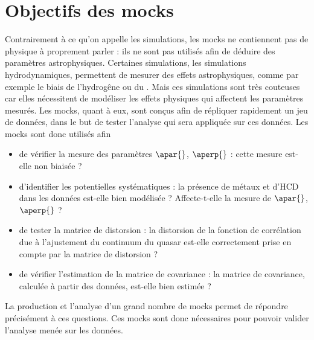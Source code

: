 \section{Objectifs des mocks}
Contrairement à ce qu'on appelle les simulations, les mocks ne contiennent pas de physique à proprement parler : ils ne sont pas utilisés afin de déduire des paramètres astrophysiques. Certaines simulations, les simulations hydrodynamiques, permettent de mesurer des effets astrophysiques, comme par exemple le biais de l'hydrogêne ou du \lya{}. Mais ces simulations sont très couteuses car elles nécessitent de modéliser les effets physiques qui affectent les paramètres mesurés.
Les mocks, quant à eux, sont conçus afin de répliquer rapidement un jeu de données, dans le but de tester l'analyse qui sera appliquée sur ces données.
Les mocks sont donc utilisés afin
\begin{itemize}[label=$\bullet$]
\item de vérifier la mesure des paramètres $\apar{}$, $\aperp{}$ : cette mesure est-elle non biaisée ?
\item d'identifier les potentielles systématiques : la présence de métaux et d'HCD dans les données est-elle bien modélisée ? Affecte-t-elle la mesure de $\apar{}$, $\aperp{}$ ?
\item de tester la matrice de distorsion : la distorsion de la fonction de corrélation due à l'ajustement du continuum du quasar est-elle correctement prise en compte par la matrice de distorsion ?
\item de vérifier l'estimation de la matrice de covariance : la matrice de covariance, calculée à partir des données, est-elle bien estimée ?
\end{itemize}
La production et l'analyse d'un grand nombre de mocks permet de répondre précisément à ces questions. Ces mocks sont donc nécessaires pour pouvoir valider l'analyse menée sur les données.

